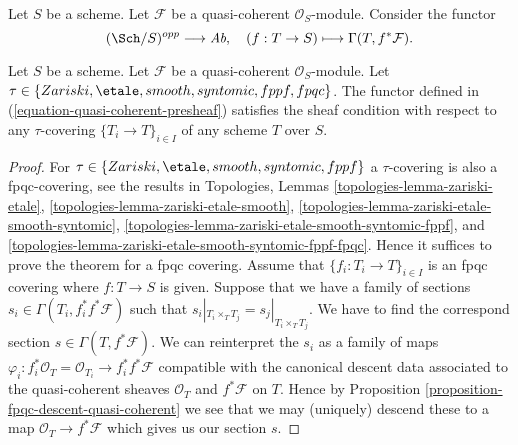 \medskip\noindent
Let $S$ be a scheme.
Let $\mathcal{F}$ be a quasi-coherent $\mathcal{O}_S$-module.
Consider the functor
\begin{equation}
\label{equation-quasi-coherent-presheaf}
(\Sch/S)^{opp} \longrightarrow \textit{Ab},
\quad
(f : T \to S) \longmapsto \Gamma(T, f^*\mathcal{F}).
\end{equation}

\begin{lemma}
\label{lemma-sheaf-condition-holds}
Let $S$ be a scheme.
Let $\mathcal{F}$ be a quasi-coherent $\mathcal{O}_S$-module.
Let $\tau \in \{Zariski, \linebreak[0] \etale, \linebreak[0] smooth,
\linebreak[0] syntomic, \linebreak[0] fppf, \linebreak[0] fpqc\}$.
The functor defined in (\ref{equation-quasi-coherent-presheaf})
satisfies the sheaf condition with respect to any $\tau$-covering
$\{T_i \to T\}_{i \in I}$ of any scheme $T$ over $S$.
\end{lemma}

\begin{proof}
For $\tau \in \{Zariski, \linebreak[0] \etale, \linebreak[0] smooth,
\linebreak[0] syntomic, \linebreak[0] fppf\}$ a $\tau$-covering
is also a fpqc-covering, see the results in
Topologies, Lemmas
\ref{topologies-lemma-zariski-etale},
\ref{topologies-lemma-zariski-etale-smooth},
\ref{topologies-lemma-zariski-etale-smooth-syntomic},
\ref{topologies-lemma-zariski-etale-smooth-syntomic-fppf}, and
\ref{topologies-lemma-zariski-etale-smooth-syntomic-fppf-fpqc}.
Hence it suffices to prove the theorem
for a fpqc covering. Assume that $\{f_i : T_i \to T\}_{i \in I}$
is an fpqc covering where $f : T \to S$ is given. Suppose that
we have a family of sections $s_i \in \Gamma(T_i , f_i^*f^*\mathcal{F})$
such that $s_i|_{T_i \times_T T_j} = s_j|_{T_i \times_T T_j}$.
We have to find the correspond section $s \in \Gamma(T, f^*\mathcal{F})$.
We can reinterpret the $s_i$ as a family of maps
$\varphi_i : f_i^*\mathcal{O}_T = \mathcal{O}_{T_i} \to f_i^*f^*\mathcal{F}$
compatible with the canonical descent data associated to the
quasi-coherent sheaves $\mathcal{O}_T$ and $f^*\mathcal{F}$ on $T$.
Hence by Proposition \ref{proposition-fpqc-descent-quasi-coherent}
we see that we may (uniquely) descend
these to a map $\mathcal{O}_T \to f^*\mathcal{F}$ which gives
us our section $s$.
\end{proof}

